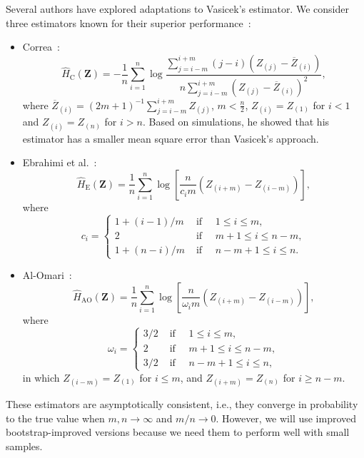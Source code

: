 \documentclass[remotesensing,article,submit,moreauthors,pdftex]{Definitions/mdpi}
\begin{document}
Several authors have explored adaptations to Vasicek's estimator. We
consider three estimators known for their superior
performance~\cite{Cassetti2022}:

\begin{itemize}
\item
  Correa~\cite{correa1995new}: \begin{equation}
  \widehat{H}_{\text{C}}(\bm{Z})=-\frac{1}{n} \sum_{i=1}^n \log \frac{\sum_{j=i-m}^{i+m}(j-i)\left(Z_{(j)}-\overline{Z}_{(i)}\right)}{n\sum_{j=i-m}^{i+m}\left(Z_{(j)}-\overline{Z}_{(i)}\right)^2},
  \end{equation} where
  \(\overline{Z}_{(i)}=(2 m+1)^{-1} \sum_{j=i-m}^{i+m} Z_{(j)}\),
  \(m< \frac{n}{2}\), \(Z_{(i)}=Z_{(1)}\) for \(i<1\) and
  \(Z_{(i)}=Z_{(n)}\) for \(i>n\). Based on simulations, he showed that
  his estimator has a smaller mean square error than Vasicek's approach.
\item
  Ebrahimi et al.~\cite{Ebrahimi1994}: \begin{equation}
  \widehat{H}_{\text{E}}(\bm{Z})=\frac{1}{n} \sum_{i=1}^n \log \left[\frac{n}{c_i m}\left(Z_{(i+m)}-Z_{(i-m)}\right)\right],
  \end{equation} where \[
  c_i=\begin{cases}1+(i-1) / m & \text { if } \quad 1 \leq i \leq m, \\ 2 & \text { if }\quad m+1 \leq i \leq n-m,\\ 1+(n-i) / m & \text { if }\quad n-m+1 \leq i \leq n.\end{cases}
  \]
\item
  Al-Omari~\cite{IbrahimAlOmari2014}: \[
  \widehat{H}_{\text{AO}}(\bm{Z})=\frac{1}{n} \sum_{i=1}^n \log \left[\frac{n}{\omega_i m}\left(Z_{(i+m)}-Z_{(i-m)}\right)\right],
  \] where \[
  \omega_i= \begin{cases}3/2 & \text { if }\quad 1 \leq i \leq m, \\ 2 & \text { if }\quad m+1 \leq i \leq n-m, \\ 3/2 & \text { if } \quad n-m+1 \leq i \leq n,\end{cases}
  \] in which \(Z_{(i-m)}=Z_{(1)}\) for \(i \leq m\), and
  \(Z_{(i+m)}=Z_{(n)}\) for \(i \geq n-m\).
\end{itemize}

These estimators are asymptotically consistent, i.e., they converge in
probability to the true value when \(m,n\rightarrow\infty\) and
\(m/n\rightarrow0\). However, we will use improved bootstrap-improved
versions because we need them to perform well with small samples.
\end{document}
